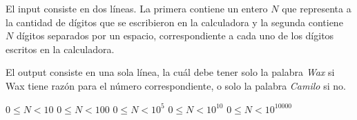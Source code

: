 \documentclass{oci}
\begin{document}
\begin{inputDescription}
El input consiste en dos líneas. La primera contiene un entero $N$ que representa a la cantidad de dígitos que se escribieron en la calculadora y la segunda contiene $N$ dígitos separados por un espacio, correspondiente a cada uno de los dígitos escritos en la calculadora.
\end{inputDescription}

\begin{outputDescription}
El output consiste en una sola línea, la cuál debe tener solo la palabra \textit{Wax} si Wax tiene razón para el número correspondiente, o solo la palabra \textit{Camilo} si no.
\end{outputDescription}

\begin{scoreDescription}
   $ 0 \le N < 10$
   $ 0 \le N < 100$
   $ 0 \le N < 10^5$
   $ 0 \le N < 10^{10}$
   $ 0 \le N < 10^{10000}$
\end{scoreDescription}

\begin{sampleDescription}
\end{sampleDescription}
\end{document}
